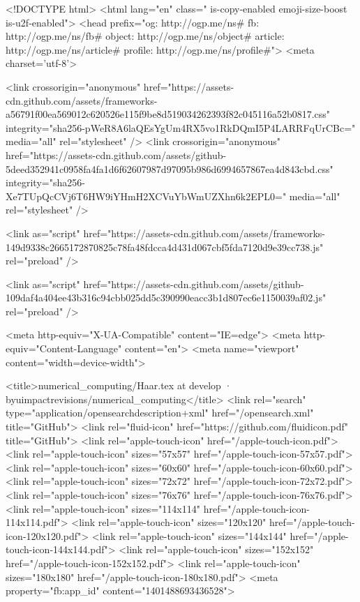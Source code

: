 



<!DOCTYPE html>
<html lang="en" class=" is-copy-enabled emoji-size-boost is-u2f-enabled">
  <head prefix="og: http://ogp.me/ns# fb: http://ogp.me/ns/fb# object: http://ogp.me/ns/object# article: http://ogp.me/ns/article# profile: http://ogp.me/ns/profile#">
    <meta charset='utf-8'>

    <link crossorigin="anonymous" href="https://assets-cdn.github.com/assets/frameworks-a56791f00ea569012c620526e115f9be8d519034262393f82c045116a52b0817.css" integrity="sha256-pWeR8A6laQEsYgUm4RX5vo1RkDQmI5P4LARRFqUrCBc=" media="all" rel="stylesheet" />
    <link crossorigin="anonymous" href="https://assets-cdn.github.com/assets/github-5deed352941c0958fa4fa1d6f62607987d97095b986d6994657867ea4d843cbd.css" integrity="sha256-Xe7TUpQcCVj6T6HW9iYHmH2XCVuYbWmUZXhn6k2EPL0=" media="all" rel="stylesheet" />
    
    
    
    
    

    <link as="script" href="https://assets-cdn.github.com/assets/frameworks-149d9338c2665172870825c78fa48fdcca4d431d067cbf5fda7120d9e39cc738.js" rel="preload" />
    
    <link as="script" href="https://assets-cdn.github.com/assets/github-109daf4a404ee43b316c94cbb025dd5c390990eacc3b1d807ec6e1150039af02.js" rel="preload" />

    <meta http-equiv="X-UA-Compatible" content="IE=edge">
    <meta http-equiv="Content-Language" content="en">
    <meta name="viewport" content="width=device-width">
    
    
    <title>numerical_computing/Haar.tex at develop · byuimpactrevisions/numerical_computing</title>
    <link rel="search" type="application/opensearchdescription+xml" href="/opensearch.xml" title="GitHub">
    <link rel="fluid-icon" href="https://github.com/fluidicon.pdf" title="GitHub">
    <link rel="apple-touch-icon" href="/apple-touch-icon.pdf">
    <link rel="apple-touch-icon" sizes="57x57" href="/apple-touch-icon-57x57.pdf">
    <link rel="apple-touch-icon" sizes="60x60" href="/apple-touch-icon-60x60.pdf">
    <link rel="apple-touch-icon" sizes="72x72" href="/apple-touch-icon-72x72.pdf">
    <link rel="apple-touch-icon" sizes="76x76" href="/apple-touch-icon-76x76.pdf">
    <link rel="apple-touch-icon" sizes="114x114" href="/apple-touch-icon-114x114.pdf">
    <link rel="apple-touch-icon" sizes="120x120" href="/apple-touch-icon-120x120.pdf">
    <link rel="apple-touch-icon" sizes="144x144" href="/apple-touch-icon-144x144.pdf">
    <link rel="apple-touch-icon" sizes="152x152" href="/apple-touch-icon-152x152.pdf">
    <link rel="apple-touch-icon" sizes="180x180" href="/apple-touch-icon-180x180.pdf">
    <meta property="fb:app_id" content="1401488693436528">


